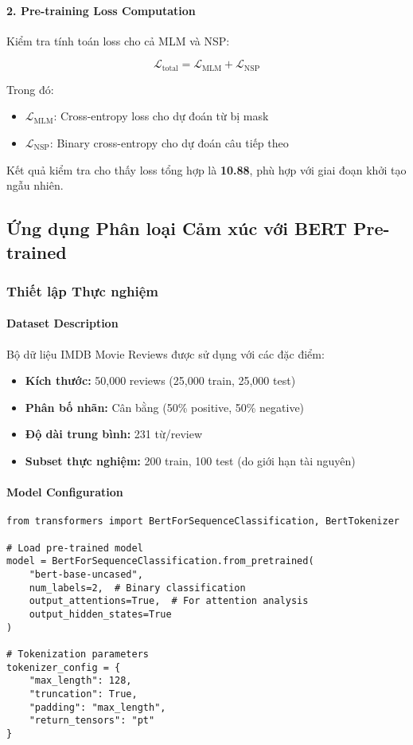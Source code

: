 \paragraph{2. Pre-training Loss Computation}
Kiểm tra tính toán loss cho cả MLM và NSP:

\begin{equation}
\mathcal{L}_{\text{total}} = \mathcal{L}_{\text{MLM}} + \mathcal{L}_{\text{NSP}}
\end{equation}

Trong đó:
\begin{itemize}
    \item $\mathcal{L}_{\text{MLM}}$: Cross-entropy loss cho dự đoán từ bị mask
    \item $\mathcal{L}_{\text{NSP}}$: Binary cross-entropy cho dự đoán câu tiếp theo
\end{itemize}

Kết quả kiểm tra cho thấy loss tổng hợp là \textbf{10.88}, phù hợp với giai đoạn khởi tạo ngẫu nhiên.

\subsection{Ứng dụng Phân loại Cảm xúc với BERT Pre-trained}
\label{ssec:phan_loai_cam_xuc}

\subsubsection{Thiết lập Thực nghiệm}

\paragraph{Dataset Description}
Bộ dữ liệu IMDB Movie Reviews được sử dụng với các đặc điểm:
\begin{itemize}
    \item \textbf{Kích thước:} 50,000 reviews (25,000 train, 25,000 test)
    \item \textbf{Phân bố nhãn:} Cân bằng (50\% positive, 50\% negative)  
    \item \textbf{Độ dài trung bình:} 231 từ/review
    \item \textbf{Subset thực nghiệm:} 200 train, 100 test (do giới hạn tài nguyên)
\end{itemize}

\paragraph{Model Configuration}
\begin{verbatim}
from transformers import BertForSequenceClassification, BertTokenizer

# Load pre-trained model
model = BertForSequenceClassification.from_pretrained(
    "bert-base-uncased",
    num_labels=2,  # Binary classification
    output_attentions=True,  # For attention analysis
    output_hidden_states=True
)

# Tokenization parameters
tokenizer_config = {
    "max_length": 128,
    "truncation": True,
    "padding": "max_length",
    "return_tensors": "pt"
}
\end{verbatim}

